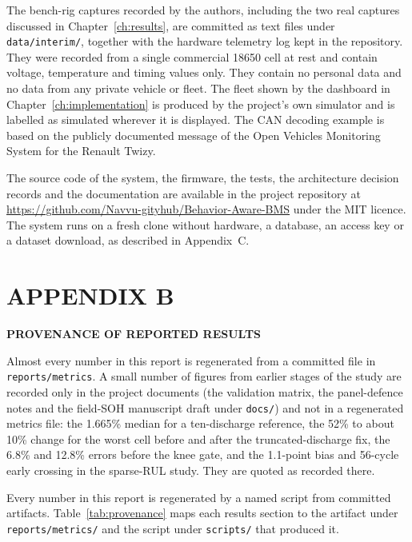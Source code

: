 \documentclass[12pt,a4paper]{amritareport}
\begin{document}
The bench-rig captures recorded by the authors, including the two real captures discussed in Chapter~\ref{ch:results}, are committed as text files under \texttt{data/interim/}, together with the hardware telemetry log kept in the repository. They were recorded from a single commercial 18650 cell at rest and contain voltage, temperature and timing values only. They contain no personal data and no data from any private vehicle or fleet. The fleet shown by the dashboard in Chapter~\ref{ch:implementation} is produced by the project's own simulator and is labelled as simulated wherever it is displayed. The CAN decoding example is based on the publicly documented message of the Open Vehicles Monitoring System for the Renault Twizy.

The source code of the system, the firmware, the tests, the architecture decision records and the documentation are available in the project repository at \url{https://github.com/Navvu-gityhub/Behavior-Aware-BMS} under the MIT licence. The system runs on a fresh clone without hardware, a database, an access key or a dataset download, as described in Appendix~C.

\chapter*{APPENDIX B}

\begin{center}
\textbf{PROVENANCE OF REPORTED RESULTS}
\end{center}

Almost every number in this report is regenerated from a committed file in \texttt{reports/}\allowbreak\texttt{metrics}. A small number of figures from earlier stages of the study are recorded only in the project documents (the validation matrix, the panel-defence notes and the field-SOH manuscript draft under \texttt{docs/}) and not in a regenerated metrics file: the 1.665\% median for a ten-discharge reference, the 52\% to about 10\% change for the worst cell before and after the truncated-discharge fix, the 6.8\% and 12.8\% errors before the knee gate, and the 1.1-point bias and 56-cycle early crossing in the sparse-RUL study. They are quoted as recorded there.


Every number in this report is regenerated by a named script from committed artifacts. Table~\ref{tab:provenance} maps each results section to the artifact under \texttt{reports/metrics/} and the script under \texttt{scripts/} that produced it.
\end{document}
